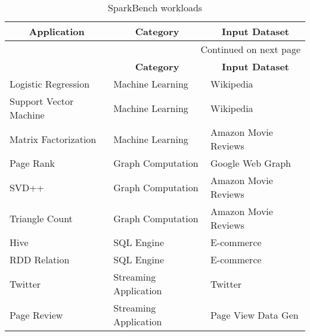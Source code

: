 \begin{longtable}{|l|X|X|}
\caption{SparkBench workloads} \label{tab:sparkbench} \\

\hline 
\endfirsthead

\hline
\multicolumn{1}{|c|}{\textbf{Application}} & \multicolumn{1}{c|}{\textbf{Category}} & \multicolumn{1}{c|}{\textbf{Input Dataset}}\\
\hline 
\endhead

\hline \multicolumn{3}{|r|}{{Continued on next page}} \\ \hline
\endfoot

\hline
\endlastfoot

\multicolumn{1}{|c|}{\textbf{Application}} & \multicolumn{1}{c|}{\textbf{Category}} & \multicolumn{1}{c|}{\textbf{Input Dataset}}\\ \hline


Logistic Regression       & Machine Learning          & Wikipedia                                        \\ \hline
Support Vector Machine    & Machine Learning          & Wikipedia                                       \\ \hline
Matrix Factorization      & Machine Learning          & Amazon Movie Reviews
\\ \hline
Page Rank	  		      & Graph Computation         & Google Web Graph
\\ \hline
SVD++			          & Graph Computation         & Amazon Movie Reviews
\\ \hline
Triangle Count		      & Graph Computation         & Amazon Movie Reviews
\\ \hline
Hive  					  & SQL Engine                & E-commerce
\\ \hline
RDD Relation              & SQL Engine	              & E-commerce
\\ \hline
Twitter     	 	      & Streaming Application     & Twitter
\\ \hline
Page Review		          & Streaming Application	  & Page View Data Gen
\\ \hline   
\end{longtable}